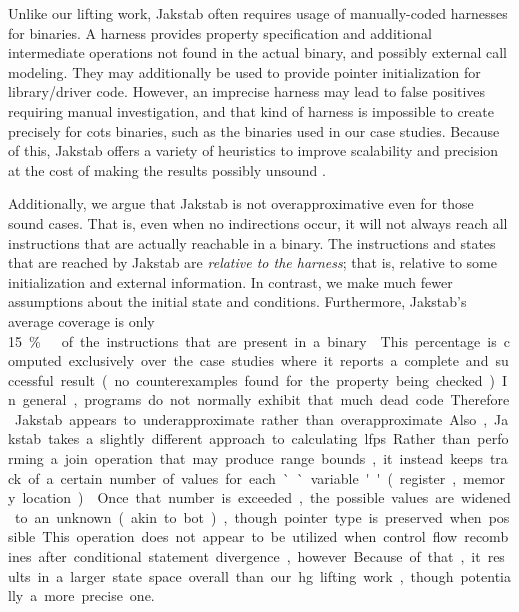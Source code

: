 Unlike our lifting work, Jakstab often requires usage of manually-coded harnesses for binaries.
A harness provides property specification and additional intermediate operations not found in the actual binary, and possibly external call modeling.
They may additionally be used to provide pointer initialization for library/driver code.
However, an imprecise harness may lead to false positives requiring manual investigation, and that kind of harness is impossible to create precisely for \ac{cots} binaries, such as the binaries used in our case studies.
Because of this, Jakstab offers a variety of heuristics to improve scalability and precision at the cost of making the results possibly unsound  \autocite[129]{kinder2010static}.

Additionally, we argue that Jakstab is not overapproximative even for those sound cases.
That is, even when no indirections occur, it will not always reach all instructions that are actually reachable in a binary.
The instructions and states that are reached by Jakstab
are \emph{relative to the harness}; that is, relative to some initialization
and external information.
In contrast, we make much fewer assumptions about the initial state and conditions.
Furthermore, Jakstab's average coverage is only \SI{15}\percent\ of the instructions that are present in a binary \autocite[Table~6.2]{kinder2010static}.
This percentage is computed exclusively over the case studies where it reports a complete and successful result (no counterexamples found for the property being checked).
In general, programs do not normally exhibit that much dead code.
Therefore Jakstab appears to underapproximate rather than overapproximate.

Also, Jakstab takes a slightly different approach to calculating \acp{lfp}.
Rather than performing a join operation that may produce range bounds,
it instead keeps track of a certain number of values for each ``variable'' (register, memory location).
Once that number is exceeded, the possible values are widened to an unknown (akin to \gls{bot}), though pointer type is preserved when possible.
This operation does not appear to be utilized when control flow recombines
after conditional statement divergence, however.
Because of that, it results in a larger state space overall than our \ac{hg} lifting work, though potentially a more precise one.

